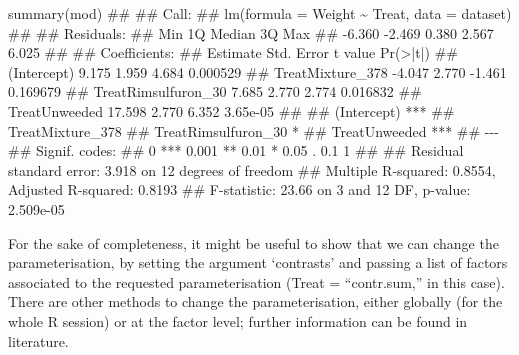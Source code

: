 \documentclass[a4paper,12pt,oneside]{book}
\newenvironment{Shaded}{\begin{snugshade}}{\end{snugshade}}
\newcommand{\DocumentationTok}[1]{#1}
\newcommand{\FunctionTok}[1]{#1}
\newcommand{\NormalTok}[1]{#1}
\begin{document}
\vspace{12pt}
\scriptsize

\begin{Shaded}
\begin{Highlighting}[]
\FunctionTok{summary}\NormalTok{(mod)}
\DocumentationTok{\#\# }
\DocumentationTok{\#\# Call:}
\DocumentationTok{\#\# lm(formula = Weight \textasciitilde{} Treat, data = dataset)}
\DocumentationTok{\#\# }
\DocumentationTok{\#\# Residuals:}
\DocumentationTok{\#\#    Min     1Q Median     3Q    Max }
\DocumentationTok{\#\# {-}6.360 {-}2.469  0.380  2.567  6.025 }
\DocumentationTok{\#\# }
\DocumentationTok{\#\# Coefficients:}
\DocumentationTok{\#\#                     Estimate Std. Error t value Pr(\textgreater{}|t|)}
\DocumentationTok{\#\# (Intercept)            9.175      1.959   4.684 0.000529}
\DocumentationTok{\#\# TreatMixture\_378      {-}4.047      2.770  {-}1.461 0.169679}
\DocumentationTok{\#\# TreatRimsulfuron\_30    7.685      2.770   2.774 0.016832}
\DocumentationTok{\#\# TreatUnweeded         17.598      2.770   6.352 3.65e{-}05}
\DocumentationTok{\#\#                        }
\DocumentationTok{\#\# (Intercept)         ***}
\DocumentationTok{\#\# TreatMixture\_378       }
\DocumentationTok{\#\# TreatRimsulfuron\_30 *  }
\DocumentationTok{\#\# TreatUnweeded       ***}
\DocumentationTok{\#\# {-}{-}{-}}
\DocumentationTok{\#\# Signif. codes:  }
\DocumentationTok{\#\# 0 \textquotesingle{}***\textquotesingle{} 0.001 \textquotesingle{}**\textquotesingle{} 0.01 \textquotesingle{}*\textquotesingle{} 0.05 \textquotesingle{}.\textquotesingle{} 0.1 \textquotesingle{} \textquotesingle{} 1}
\DocumentationTok{\#\# }
\DocumentationTok{\#\# Residual standard error: 3.918 on 12 degrees of freedom}
\DocumentationTok{\#\# Multiple R{-}squared:  0.8554, Adjusted R{-}squared:  0.8193 }
\DocumentationTok{\#\# F{-}statistic: 23.66 on 3 and 12 DF,  p{-}value: 2.509e{-}05}
\end{Highlighting}
\end{Shaded}

\normalsize

For the sake of completeness, it might be useful to show that we can change the parameterisation, by setting the argument `contrasts' and passing a list of factors associated to the requested parameterisation (Treat = ``contr.sum,'' in this case). There are other methods to change the parameterisation, either globally (for the whole R session) or at the factor level; further information can be found in literature.

\vspace{12pt}
\end{document}
